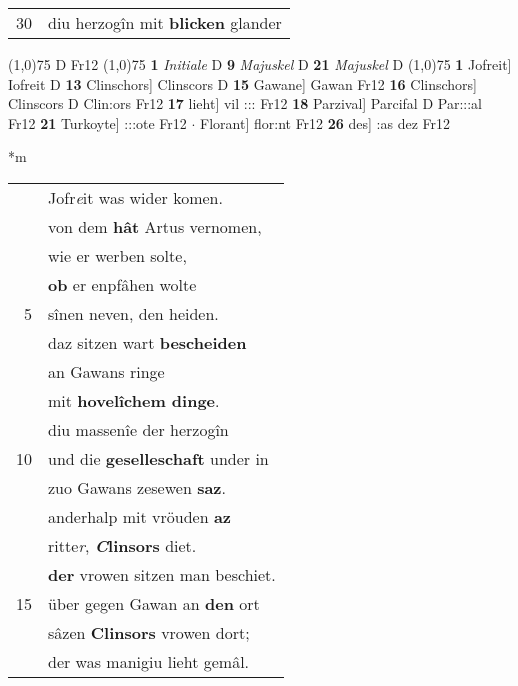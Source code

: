 \documentclass[8pt,a4paper,notitlepage]{article}
\begin{document}
\begin{table}[ht]
\begin{minipage}[t]{0.5\linewidth}
\begin{tabular}{rl}
30 & diu herzogîn mit \textbf{blicken} glander\\ 
\end{tabular}
\scriptsize
\line(1,0){75} \newline
D Fr12 \newline
\line(1,0){75} \newline
\textbf{1} \textit{Initiale} D  \textbf{9} \textit{Majuskel} D  \textbf{21} \textit{Majuskel} D  \newline
\line(1,0){75} \newline
\textbf{1} Jofreit] Iofreit D \textbf{13} Clinschors] Clinscors D \textbf{15} Gawane] Gawan Fr12 \textbf{16} Clinschors] Clinscors D Clin:ors Fr12 \textbf{17} lieht] vil ::: Fr12 \textbf{18} Parzival] Parcifal D Par:::al Fr12 \textbf{21} Turkoyte] :::ote Fr12  $\cdot$ Florant] flor:nt Fr12 \textbf{26} des] :as dez Fr12 \newline
\end{minipage}
\hspace{0.5cm}
\begin{minipage}[t]{0.5\linewidth}
\small
\begin{center}*m
\end{center}
\begin{tabular}{rl}
 & Jofr\textit{e}it was wider komen.\\ 
 & von dem \textbf{hât} Artus vernomen,\\ 
 & wie er werben solte,\\ 
 & \textbf{ob} er enpfâhen wolte\\ 
5 & sînen neven, den heiden.\\ 
 & daz sitzen wart \textbf{bescheiden}\\ 
 & an Gawans ringe\\ 
 & mit \textbf{hovelîchem dinge}.\\ 
 & diu massenîe der herzogîn\\ 
10 & und die \textbf{geselleschaft} under in\\ 
 & zuo Gawans zesewen \textbf{saz}.\\ 
 & anderhalp mit vröuden \textbf{az}\\ 
 & ritte\textit{r}, \textbf{\textit{C}linsors} diet.\\ 
 & \textbf{der} vrowen sitzen man beschiet.\\ 
15 & über gegen Gawan an \textbf{den} ort\\ 
 & sâzen \textbf{Clinsors} vrowen dort;\\ 
 & der was manigiu lieht gemâl.\\ 

\end{tabular}
\end{minipage}
\end{table}
\end{document}
